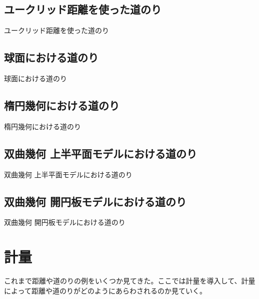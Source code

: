 \newpage

\subsection{ ユークリッド距離を使った道のり }

ユークリッド距離を使った道のり

\newpage


\subsection{ 球面における道のり }

球面における道のり

\newpage


\subsection{ 楕円幾何における道のり }

楕円幾何における道のり

\newpage


\subsection{ 双曲幾何 上半平面モデルにおける道のり }

双曲幾何 上半平面モデルにおける道のり

\newpage


\subsection{ 双曲幾何 開円板モデルにおける道のり }

双曲幾何 開円板モデルにおける道のり

\newpage


\section{ 計量 }

これまで距離や道のりの例をいくつか見てきた。ここでは計量を導入して、計量によって距離や道のりがどのようにあらわされるのか見ていく。

